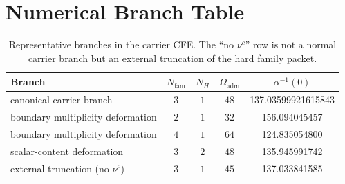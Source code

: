 \documentclass[11pt,a4paper]{article}
\theoremstyle{definition}
\theoremstyle{remark}
\newcommand{\Oadm}{\Omega_{\mathrm{adm}}}
\begin{document}
\section{Numerical Branch Table}

\begin{table}[H]
\centering
\small
\begin{tabularx}{\linewidth}{@{}>{\raggedright\arraybackslash}Xcccc@{}}
\toprule
Branch & $N_{\mathrm{fam}}$ & $N_H$ & $\Oadm$ & $\alpha^{-1}(0)$ \\
\midrule
canonical carrier branch & $3$ & $1$ & $48$ & \num{137.03599921615843} \\
boundary multiplicity deformation & $2$ & $1$ & $32$ & \num{156.094045457} \\
boundary multiplicity deformation & $4$ & $1$ & $64$ & \num{124.835054800} \\
scalar-content deformation & $3$ & $2$ & $48$ & \num{135.945991742} \\
external truncation (no $\nu^c$) & $3$ & $1$ & $45$ & \num{137.033841585} \\
\bottomrule
\end{tabularx}
\caption{Representative branches in the carrier CFE. The ``no $\nu^c$'' row is not a normal carrier branch but an external truncation of the hard family packet.}
\end{table}
\end{document}
